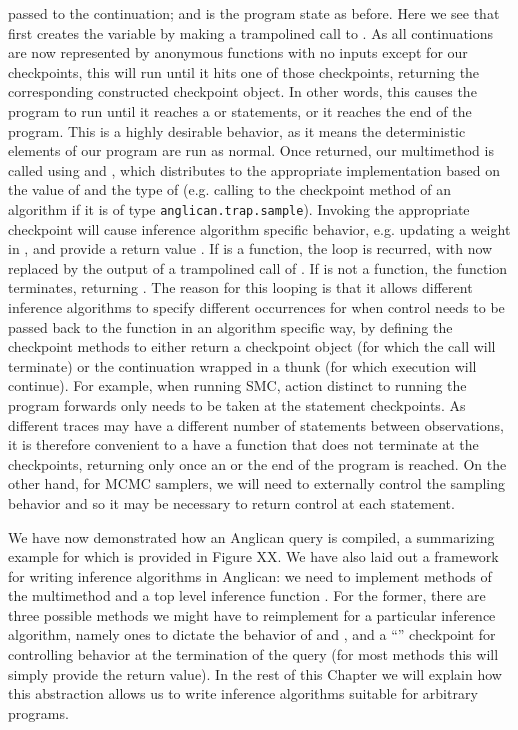 passed to the continuation; and \angstate is the program state as before.  Here we see that 
first creates the variable  by making a trampolined call to .  As all continuations are now
represented by anonymous functions with no inputs except for our checkpoints, this will run until it
hits one of those checkpoints, returning the corresponding constructed checkpoint object.  In other words,
this causes the program to run until it reaches a \sample or \observe statements, or it reaches the end of the
program.  This is a highly desirable behavior, as it means the deterministic elements of our program
are run as normal.  Once returned, our multimethod \checkpoint is called using  and
, which distributes to the appropriate \checkpoint implementation based on the value of
 and the type of  (e.g. calling to the \sample checkpoint method of an algorithm 
if it is of type  {\small \texttt{anglican.trap.sample}}).  Invoking the appropriate checkpoint will cause
inference algorithm specific behavior, e.g. updating a weight in \angstate, and provide a return value
.  If  is a function, the loop
is recurred, with  now replaced by the output of a trampolined call of .  If  is
not a function, the  function terminates, returning .  The reason for this looping is
that it allows different inference algorithms to specify different occurrences for when control needs to
be passed back to the \anginfer function in an algorithm specific way, by defining the checkpoint methods
to either return a checkpoint object (for which the  call will terminate) or the continuation
wrapped in a thunk (for which execution will continue).  For example, when running SMC,
action distinct to running the program forwards only needs to be taken at the \observe statement 
checkpoints.  As different traces may have a different number of \sample statements between observations,
it is therefore convenient to a have a function that does not terminate at the \sample checkpoints, returning
only once an \observe or the end of the program is reached.  On the other hand, for MCMC samplers, we
will need to externally control the sampling behavior and so it may be necessary to return control at each
\sample statement.

We have now demonstrated how an Anglican query is compiled, a summarizing example for which
is provided in Figure XX.  We have also laid out a framework for
writing inference algorithms in Anglican: we need to implement methods of the \checkpoint multimethod
and a top level inference function \anginfer.  For the former, there are three possible \checkpoint methods
we might have to reimplement for a particular inference algorithm, namely ones to dictate the behavior
of \sample and \observe, and a ``'' checkpoint for controlling behavior at the termination of
the query (for most methods this will simply provide the return value).  In the rest of this Chapter we will
explain how this abstraction allows us to write inference algorithms suitable for arbitrary programs.
